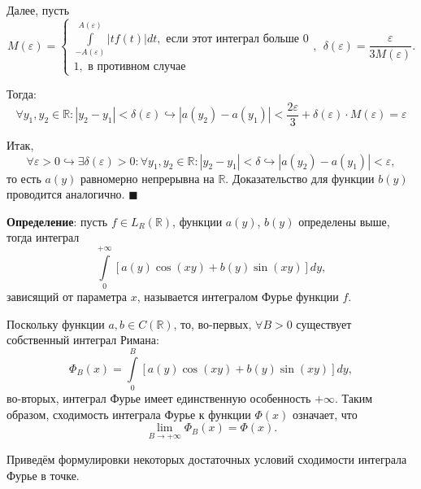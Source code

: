 \documentclass[12pt, a4paper, reqno]{article}
\begin{document}
    Далее, пусть
    \begin{equation*}
        M(\varepsilon) =
        \begin{cases}
            \int\limits_{-A(\varepsilon)}^{A(\varepsilon)}|tf(t)|dt,\text{ если этот интеграл больше 0} \\
            1,\text{ в противном случае}
        \end{cases},\ \
        \delta(\varepsilon) = \frac{\varepsilon}{3M(\varepsilon)}.
    \end{equation*}

    Тогда:
    \begin{equation*}
        \forall y_1, y_2 \in \mathbb{R}: |y_2 - y_1| < \delta(\varepsilon) \hookrightarrow
        |a(y_2) - a(y_1)| < \frac{2\varepsilon}{3} + \delta(\varepsilon) \cdot M(\varepsilon) = \varepsilon
    \end{equation*}

    Итак,
    \begin{equation*}
        \forall \varepsilon > 0 \hookrightarrow \exists \delta(\varepsilon) > 0:
        \forall y_1, y_2 \in \mathbb{R}: |y_2 - y_1| < \delta \hookrightarrow |a(y_2) - a(y_1)| < \varepsilon,
    \end{equation*}
    то есть $a(y)$ равномерно непрерывна на $\mathbb{R}$. Доказательство для функции $b(y)$ проводится
    аналогично.
    $\blacksquare$

    \textbf{Определение}: пусть $f \in L_R(\mathbb{R})$, функции $a(y)$, $b(y)$ определены выше,
    тогда интеграл
    \begin{equation*}
        \int\limits_{0}^{+\infty}[a(y)\cos{(xy)} + b(y)\sin{(xy)}]dy,
    \end{equation*}
    зависящий от параметра $x$, называется интегралом Фурье функции $f$.

    Поскольку функции $a, b \in C(\mathbb{R})$, то, во-первых, $\forall B > 0$ существует собственный
    интеграл Римана:
    \begin{equation*}
        \Phi_B(x) = \int\limits_{0}^{B}[a(y)\cos{(xy)} + b(y)\sin{(xy)}]dy,
    \end{equation*}
    во-вторых, интеграл Фурье имеет единственную особенность $+\infty$. Таким образом, сходимость
    интеграла Фурье к функции $\Phi(x)$ означает, что
    \begin{equation*}
        \lim\limits_{B \to +\infty} \Phi_B(x) = \Phi(x).
    \end{equation*}

    Приведём формулировки некоторых достаточных условий сходимости интеграла Фурье в точке.
\end{document}
